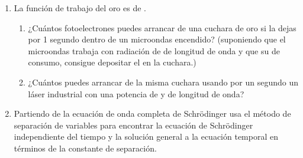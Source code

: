 \begin{enumerate}
  
  \item La función de trabajo del oro es de .
      \begin{enumerate}
          \item ¿Cuántos fotoelectrones puedes arrancar de una cuchara de oro si la dejas por 1 segundo dentro de un microondas encendido? (suponiendo que el microondas trabaja con radiación de  de longitud de onda y que su  de consumo, consigue depositar el  en la cuchara.)
          
          









          \item ¿Cuántos puedes arrancar de la misma cuchara usando por un segundo un láser industrial con una potencia de   y  de longitud de onda?
          







      \end{enumerate}
  
  
  
  
  
  
  
  
  
  \item Partiendo de la ecuación de onda completa de Schrödinger usa el método de separación de variables para encontrar la ecuación de Schrödinger independiente del tiempo y la solución general a la ecuación temporal en términos de la constante de separación.
  

\end{enumerate}
